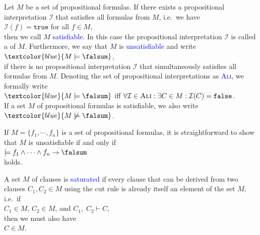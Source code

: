 \begin{Definition}[Satisfiability]  \hspace*{\fill} \linebreak
  Let $M$ be a set of propositional formulas.
  If there exists a propositional interpretation $\mathcal{I}$ that satisfies all formulas from $M$, i.e.~we have
  \\[0.2cm]
  \hspace*{1.3cm}
  $\mathcal{I}(f) = \texttt{true}$ \quad for all $f \in M$,
  \\[0.2cm]
  then we call $M$ \textcolor{blue}{satisfiable}.  In this case the propositional
  interpretation $\mathcal{I}$ is called a  of $M$.
  Furthermore, we say that $M$ is \textcolor{blue}{unsatisfiable}
  and write 
  \\[0.2cm]
  \hspace*{1.3cm}
  $\textcolor{blue}{M \models \falsum}$, 
  \\[0.2cm]
  if there is no propositional interpretation $\mathcal{I}$ that simultaneously satisfies all formulas from $M$.
  Denoting the set of propositional interpretations as
  \textsc{\textcolor{blue}{Ali}}, we formally write
  \\[0.2cm]
  \hspace*{1.3cm}
  $\textcolor{blue}{M \models \falsum}$ \quad iff \quad 
  $\forall \mathcal{I} \in \textsc{Ali}: \exists C \in M: \mathcal{I}(C) = \texttt{false}$.
  \\[0.2cm]
  If a set $M$ of propositional formulas is satisfiable, we also write
  \\[0.2cm]
  \hspace*{1.3cm}
  $\textcolor{blue}{M \not\models \falsum}$.
  \eox
\end{Definition}

\remarkEng 
If $M = \{ f_1, \cdots, f_n \}$ is a set of propositional formulas, it is straightforward to show that
$M$ is unsatisfiable if and only if
\\[0.2cm]
\hspace*{1.3cm}
$\models f_1 \wedge \cdots \wedge f_n \rightarrow \falsum$
\\[0.2cm]
holds. \eox

\begin{Definition} \hspace*{\fill} \linebreak
  A set $M$ of clauses is \textcolor{blue}{saturated}  if every clause that can be derived from two
  clauses $C_1, C_2 \in M$ using the cut rule is already itself an element of
  the set $M$, i.e.~if
  \\[0.2cm]
  \hspace*{1.3cm}
  $C_1 \in M$, \quad $C_2 \in M$, \quad and \quad $C_1,\; C_2 \vdash C$,
  \\[0.2cm]
  then we must also have 
  \\[0.2cm]
  \hspace*{1.3cm}
  $C \in M$.
\end{Definition}
 
